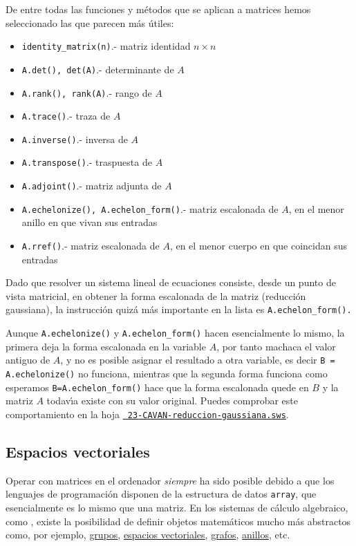 De entre todas las funciones y m\'etodos que se aplican a matrices hemos
seleccionado las que parecen m\'as \'utiles: 

\def\bfitem#1:{\item\lstinline|#1|.- }
\begin{itemize}
\renewcommand{\labelitemi}{$\circ$}
 \bfitem identity_matrix(n): matriz identidad $n\times n$  
 \bfitem A.det(), det(A): determinante de $A$
 \bfitem A.rank(), rank(A): rango de $A$
 \bfitem A.trace(): traza de $A$
 \bfitem A.inverse(): inversa de $A$
 \bfitem A.transpose(): traspuesta de $A$
 \bfitem A.adjoint(): matriz adjunta de $A$
 \bfitem A.echelonize(), A.echelon_form(): matriz escalonada de $A$, en el
menor anillo en que vivan sus entradas
\bfitem A.rref(): matriz escalonada de $A$, en el menor cuerpo en que coincidan
sus entradas
\end{itemize}

Dado que resolver un sistema lineal de ecuaciones consiste, desde un punto de
vista matricial, en obtener la forma escalonada de la matriz (reducci\'on
gaussiana), la instrucci\'on quiz\'a m\'as importante en la lista es
\lstinline|A.echelon_form().|

Aunque \lstinline|A.echelonize()| y \lstinline|A.echelon_form()| hacen
esencialmente lo mismo, la primera deja la forma escalonada en la variable $A$,
por tanto machaca el valor antiguo de $A$,  y no es posible asignar el resultado
a otra variable, es decir \lstinline|B = A.echelonize()| no funciona, mientras
que  la segunda forma funciona como esperamos \lstinline|B=A.echelon_form()|
hace que 
la forma escalonada quede en $B$ y la matriz $A$ todav\'{\i}a existe con su
valor original. Puedes comprobar este comportamiento en la hoja 
\href{http://sage.mat.uam.es:8888/home/pub/2/}{\tt
23-CAVAN-reduccion-gaussiana.sws}.

\subsection{Espacios vectoriales}

Operar con matrices en el ordenador {\itshape siempre} ha sido posible debido a
que los lenguajes de programaci\'on disponen de la estructura de datos
\lstinline|array|, que esencialmente es lo mismo que una matriz. En los sistemas
de c\'alculo algebraico, como {\sage}, existe la posibilidad de definir objetos
matem\'aticos mucho m\'as abstractos como, por ejemplo,
\href{http://150.244.21.37/PDFs/CAVAN/quickref-algebra.pdf}{grupos},  
\href{http://150.244.21.37/PDFs/CAVAN/quickref-linalg.pdf}{espacios vectoriales}, 
\href{http://150.244.21.37/PDFs/CAVAN/quickref-graphtheory.pdf}{grafos}, 
\href{http://150.244.21.37/PDFs/CAVAN/quickref-algebra.pdf}{anillos}, etc. 




